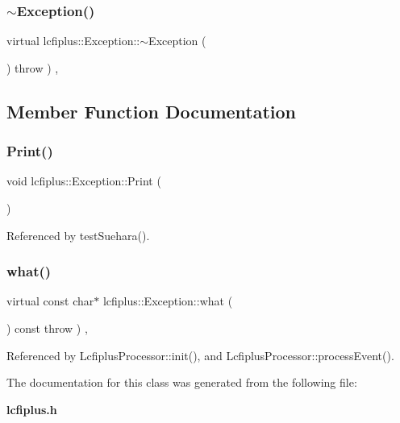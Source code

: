 \mbox{\label{classlcfiplus_1_1Exception_aa5480d1aa884c98f3a80fe571e74b6b9}} 
\subsubsection{$\sim$\+Exception()}
{\footnotesize\ttfamily virtual lcfiplus\+::\+Exception\+::$\sim$\+Exception (\begin{DoxyParamCaption}{ }\end{DoxyParamCaption}) throw  ) \hspace{0.3cm}{\ttfamily [inline]}, {\ttfamily [virtual]}}



\subsection{Member Function Documentation}
\mbox{\label{classlcfiplus_1_1Exception_a1d9fd6e9354c8e59c515123562794e9a}} 
\subsubsection{Print()}
{\footnotesize\ttfamily void lcfiplus\+::\+Exception\+::\+Print (\begin{DoxyParamCaption}{ }\end{DoxyParamCaption})\hspace{0.3cm}{\ttfamily [inline]}}



Referenced by test\+Suehara().

\mbox{\label{classlcfiplus_1_1Exception_a02bb92e32ade5c7056af9384a7788c4f}} 
\subsubsection{what()}
{\footnotesize\ttfamily virtual const char$\ast$ lcfiplus\+::\+Exception\+::what (\begin{DoxyParamCaption}{ }\end{DoxyParamCaption}) const throw  ) \hspace{0.3cm}{\ttfamily [inline]}, {\ttfamily [virtual]}}



Referenced by Lcfiplus\+Processor\+::init(), and Lcfiplus\+Processor\+::process\+Event().



The documentation for this class was generated from the following file\+:\begin{DoxyCompactItemize}
\item 
\textbf{ lcfiplus.\+h}\end{DoxyCompactItemize}
